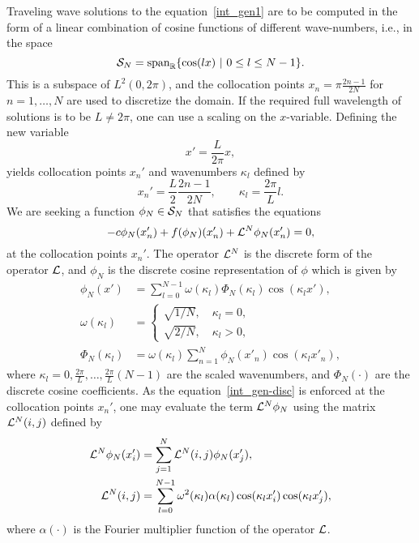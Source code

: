 Traveling wave solutions to the equation~\eqref{int_gen1}
are to be computed in the form of a linear combination of cosine functions of different
wave-numbers, i.e., in the space
\begin{equation}
\mathcal{S}_N = \mbox{span}_{\mathbb{R}}\{ \cos(lx) ~|~ 0 \leq l \leq N-1 \}
.
\end{equation}
This is a subspace of $L^2(0,2\pi)$, and the collocation points 
$x_n = \pi \frac{2n -1}{2N}$ for $n = 1,\dots, N$ are used to discretize the domain.  
If the required full wavelength of solutions is to be $L \neq 2\pi$, 
one can use a scaling on the $x$-variable. 
Defining the new variable
\begin{equation*}
x' = \frac{L}{2\pi}x, 
\end{equation*}
yields collocation points $x_n'$ and wavenumbers $\kappa_l$ defined by
\begin{equation*}
x_n' = \frac{L}{2} \frac{2n -1}{2N}, \quad\quad \kappa_l = \frac{2\pi}{L}l. 
\end{equation*}
We are seeking a function $\phi_N \in \mathcal{S}_N$ that satisfies the equations
\begin{equation}
-c\phi_N(x_n') + f(\phi_N)(x_n') + \mathcal{L}^N\phi_N(x_n') = 0, \label{int_gen-disc}
\end{equation}
at the collocation points $x_n'$.
The operator $\mathcal{L}^N$ is the discrete form of the operator $\mathcal{L}$, 
and $\phi_N$ is the discrete cosine representation of $\phi$
which is given by
\begin{align*}
\phi_N(x') &= \sum_{l = 0}^{N-1} \omega(\kappa_l)\Phi_N(\kappa_l)\cos(\kappa_{l}x'),\\
\omega(\kappa_l) &= 
\begin{cases}
\sqrt{1/N}, \quad \kappa_l = 0, \\
\sqrt{2/N}, \quad \kappa_l > 0,
\end{cases}                  \\
\Phi_N(\kappa_l) &= \omega(\kappa_l) \sum_{n = 1}^{N} \phi_N(x'_n) \cos(\kappa_l x'_n),
\end{align*}
where $\kappa_l = 0,\frac{2\pi}{L},\ldots, \frac{2\pi}{L}(N-1)$ are the scaled wavenumbers,
and $\Phi_N(\cdot)$ are the discrete cosine coefficients.
As the equation~\eqref{int_gen-disc} is enforced at the collocation points $x_n'$, 
one may evaluate the term $\mathcal{L}^N\phi_N$ using the matrix $\mathcal{L}^N(i,j)$ 
defined by
\begin{align*}
\mathcal{L}^N\phi_N(x'_i) &= \sum_{j=1}^{N}\mathcal{L}^N(i,j) \phi_N(x'_j),\\
\mathcal{L}^N(i,j) &= \sum_{l=0}^{N-1} \omega^2(\kappa_l) \alpha(\kappa_l) \cos(\kappa_l x'_i) \cos(\kappa_l x'_j),
\end{align*}
where $\alpha(\cdot)$ is the Fourier multiplier function of the operator $\mathcal{L}$.




